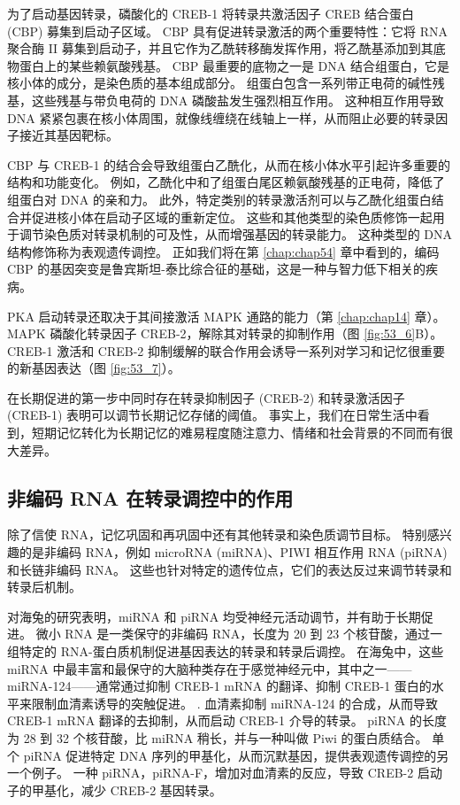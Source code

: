 为了启动基因转录，磷酸化的 CREB-1 将转录共激活因子 CREB 结合蛋白 (CBP) 募集到启动子区域。 CBP 具有促进转录激活的两个重要特性：它将 RNA 聚合酶 II 募集到启动子，并且它作为乙酰转移酶发挥作用，将乙酰基添加到其底物蛋白上的某些赖氨酸残基。 CBP 最重要的底物之一是 DNA 结合组蛋白，它是核小体的成分，是染色质的基本组成部分。 组蛋白包含一系列带正电荷的碱性残基，这些残基与带负电荷的 DNA 磷酸盐发生强烈相互作用。 这种相互作用导致 DNA 紧紧包裹在核小体周围，就像线缠绕在线轴上一样，从而阻止必要的转录因子接近其基因靶标。

CBP 与 CREB-1 的结合会导致组蛋白乙酰化，从而在核小体水平引起许多重要的结构和功能变化。 例如，乙酰化中和了组蛋白尾区赖氨酸残基的正电荷，降低了组蛋白对 DNA 的亲和力。 此外，特定类别的转录激活剂可以与乙酰化组蛋白结合并促进核小体在启动子区域的重新定位。 这些和其他类型的染色质修饰一起用于调节染色质对转录机制的可及性，从而增强基因的转录能力。 这种类型的 DNA 结构修饰称为表观遗传调控。 正如我们将在第 \ref{chap:chap54} 章中看到的，编码 CBP 的基因突变是鲁宾斯坦-泰比综合征的基础，这是一种与智力低下相关的疾病。

PKA 启动转录还取决于其间接激活 MAPK 通路的能力（第 \ref{chap:chap14} 章）。 MAPK 磷酸化转录因子 CREB-2，解除其对转录的抑制作用（图 \ref{fig:53_6}B）。 CREB-1 激活和 CREB-2 抑制缓解的联合作用会诱导一系列对学习和记忆很重要的新基因表达（图 \ref{fig:53_7}）。

在长期促进的第一步中同时存在转录抑制因子 (CREB-2) 和转录激活因子 (CREB-1) 表明可以调节长期记忆存储的阈值。 事实上，我们在日常生活中看到，短期记忆转化为长期记忆的难易程度随注意力、情绪和社会背景的不同而有很大差异。

\subsection{非编码 RNA 在转录调控中的作用}
除了信使 RNA，记忆巩固和再巩固中还有其他转录和染色质调节目标。 特别感兴趣的是非编码 RNA，例如 microRNA (miRNA)、PIWI 相互作用 RNA (piRNA) 和长链非编码 RNA。 这些也针对特定的遗传位点，它们的表达反过来调节转录和转录后机制。

对海兔的研究表明，miRNA 和 piRNA 均受神经元活动调节，并有助于长期促进。 微小 RNA 是一类保守的非编码 RNA，长度为 20 到 23 个核苷酸，通过一组特定的 RNA-蛋白质机制促进基因表达的转录和转录后调控。 在海兔中，这些 miRNA 中最丰富和最保守的大脑种类存在于感觉神经元中，其中之一——miRNA-124——通常通过抑制 CREB-1 mRNA 的翻译、抑制 CREB-1 蛋白的水平来限制血清素诱导的突触促进。 . 血清素抑制 miRNA-124 的合成，从而导致 CREB-1 mRNA 翻译的去抑制，从而启动 CREB-1 介导的转录。 piRNA 的长度为 28 到 32 个核苷酸，比 miRNA 稍长，并与一种叫做 Piwi 的蛋白质结合。 单个 piRNA 促进特定 DNA 序列的甲基化，从而沉默基因，提供表观遗传调控的另一个例子。 一种 piRNA，piRNA-F，增加对血清素的反应，导致 CREB-2 启动子的甲基化，减少 CREB-2 基因转录。

